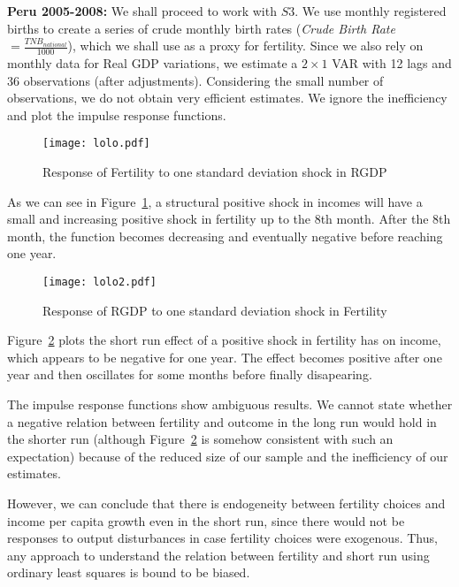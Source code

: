 \documentclass[12pt]{article}%
\begin{document}
\textbf{Peru 2005-2008:} We shall proceed to work with $S3$. We use monthly registered births to create a series of crude monthly birth rates (\emph{Crude Birth Rate}$=\frac{TNB_{national}}{1000}$), which we shall use as a proxy for fertility. Since we also rely on monthly data for Real GDP variations, we estimate a $2\times1$ VAR with 12 lags and 36 observations (after adjustments). Considering the small number of observations, we do not obtain very efficient estimates. We ignore the inefficiency and plot the impulse response functions.
\begin{figure}[h]
\caption{Response of Fertility to one standard deviation shock in RGDP}
\centering
\texttt{[image: lolo.pdf]} \\
\footnotesize
\label{VAR4}
\end{figure}
As we can see in Figure~\ref{VAR4}, a structural positive shock in incomes will have a small and increasing positive shock in fertility up to the 8th month. After the 8th month, the function becomes decreasing and eventually negative before reaching one year.
\begin{figure}[h]
\caption{Response of RGDP to one standard deviation shock in Fertility}
\centering
\texttt{[image: lolo2.pdf]} \\
\footnotesize
\label{VAR5}
\end{figure}
Figure~\ref{VAR5} plots the short run effect of a positive shock in fertility has on income, which appears to be negative for one year. The effect becomes positive after one year and then oscillates for some months before finally disapearing.

The impulse response functions show ambiguous results. We cannot state whether a negative relation between fertility and outcome in the long run would hold in the shorter run (although Figure~\ref{VAR5} is somehow consistent with such an expectation) because of the reduced size of our sample and the inefficiency of our estimates.

However, we can conclude that there is endogeneity between fertility choices and income per capita growth even in the short run, since there would not be responses to output disturbances in case fertility choices were exogenous. Thus, any approach to understand the relation between fertility and short run using ordinary least squares is bound to be biased.
\end{document}
